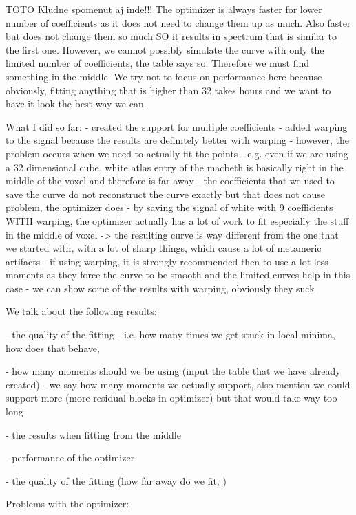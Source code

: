 TOTO Kludne spomenut aj inde!!! The optimizer is always faster for lower number of coefficients as it does not need to change them up as much. Also faster but does not change them so much SO it results in spectrum that is similar to the first one. However, we cannot possibly simulate the curve with only the limited number of coefficients, the table says so. Therefore we must find something in the middle. We try not to focus on performance here because obviously, fitting anything that is higher than 32 takes hours and we want to have it look the best way we can.




What I did so far:
- created the support for multiple coefficients
- added warping to the signal because the results are definitely better with warping
- however, the problem occurs when we need to actually fit the points - e.g. even if we are using a 32 dimensional cube, white atlas entry of the macbeth is basically right in the middle of the voxel and therefore is far away
- the coefficients that we used to save the curve do not reconstruct the curve exactly but that does not cause problem, the optimizer does
- by saving the signal of white with 9 coefficients WITH warping, the optimizer actually has a lot of work to fit especially the stuff in the middle of voxel -> the resulting curve is way different from the one that we started with, with a lot of sharp things, which cause a lot of metameric artifacts
- if using warping, it is strongly recommended then to use a lot less moments as they force the curve to be smooth and the limited curves help in this case
- we can show some of the results with warping, obviously they suck


We talk about the following results:

- the quality of the fitting - i.e. how many times we get stuck in local minima, how does that behave,

- how many moments should we be using (input the table that we have already created) - we say how many moments we actually support, also mention we could support more (more residual blocks in optimizer) but that would take way too long

- the results when fitting from the middle



- performance of the optimizer

- the quality of the fitting (how far away do we fit, )


Problems with the optimizer:

